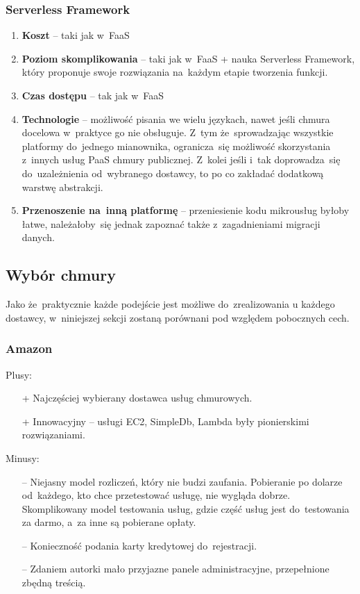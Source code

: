 \documentclass[12pt,a4paper,twoside,titlepage,openright]{book}
\begin{document}
\subsubsection{Serverless Framework}

\begin{enumerate}
	\item \textbf{Koszt} -- taki jak w~FaaS
	\item \textbf{Poziom skomplikowania} -- taki jak w~FaaS + nauka Serverless Framework, który proponuje swoje rozwiązania na~każdym etapie tworzenia funkcji. 
	\item \textbf{Czas dostępu} -- tak jak w~FaaS
	\item \textbf{Technologie} -- możliwość pisania we wielu językach, nawet jeśli chmura docelowa w~praktyce go nie obsługuje. Z~tym że~sprowadzając wszystkie platformy do~jednego mianownika, ogranicza~się możliwość skorzystania z~innych usług PaaS chmury publicznej. Z~kolei jeśli i~tak doprowadza~się do~uzależnienia od~wybranego dostawcy, to po co zakładać dodatkową warstwę abstrakcji.
	\item \textbf{Przenoszenie na~inną platformę} -- przeniesienie kodu mikrousług byłoby łatwe, należałoby~się jednak zapoznać także z~zagadnieniami migracji danych.
\end{enumerate}
	
\subsection{Wybór chmury}

Jako że~praktycznie każde podejście jest możliwe do~zrealizowania u każdego dostawcy, w~niniejszej sekcji zostaną porównani pod względem pobocznych cech.

\subsubsection{Amazon}

Plusy:
\begin{itemize}
\item[+] Najczęściej wybierany dostawca usług chmurowych.
\item[+] Innowacyjny -- usługi EC2, SimpleDb, Lambda były pionierskimi rozwiązaniami.
\end{itemize}

\noindent
Minusy:
\begin{itemize}
\item[--] Niejasny model rozliczeń, który nie budzi zaufania. Pobieranie po dolarze od~każdego, kto chce przetestować usługę, nie wygląda dobrze. Skomplikowany model testowania usług, gdzie część usług jest do~testowania za darmo, a~za inne są pobierane opłaty. 
\item[--] Konieczność podania karty kredytowej do~rejestracji.
\item[--] Zdaniem autorki mało przyjazne panele administracyjne, przepełnione zbędną treścią.
\end{itemize}
\end{document}
